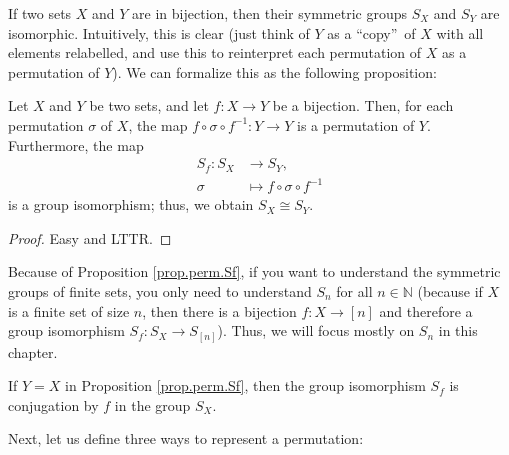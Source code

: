 If two sets $X$ and $Y$ are in bijection, then their symmetric groups $S_{X}$
and $S_{Y}$ are isomorphic. Intuitively, this is clear (just think of $Y$ as a
\textquotedblleft copy\textquotedblright\ of $X$ with all elements relabelled,
and use this to reinterpret each permutation of $X$ as a permutation of $Y$).
We can formalize this as the following proposition:

\begin{proposition}
\label{prop.perm.Sf}Let $X$ and $Y$ be two sets, and let $f:X\rightarrow Y$ be
a bijection. Then, for each permutation $\sigma$ of $X$, the map $f\circ
\sigma\circ f^{-1}:Y\rightarrow Y$ is a permutation of $Y$. Furthermore, the
map%
\begin{align*}
S_{f}:S_{X}  &  \rightarrow S_{Y},\\
\sigma &  \mapsto f\circ\sigma\circ f^{-1}%
\end{align*}
is a group isomorphism; thus, we obtain $S_{X}\cong S_{Y}$.
\end{proposition}

\begin{proof}
Easy and LTTR.
\end{proof}

Because of Proposition \ref{prop.perm.Sf}, if you want to understand the
symmetric groups of finite sets, you only need to understand $S_{n}$ for all
$n\in\mathbb{N}$ (because if $X$ is a finite set of size $n$, then there is a
bijection $f:X\rightarrow\left[  n\right]  $ and therefore a group isomorphism
$S_{f}:S_{X}\rightarrow S_{\left[  n\right]  }$). Thus, we will focus mostly
on $S_{n}$ in this chapter.

\begin{remark}
If $Y=X$ in Proposition \ref{prop.perm.Sf}, then the group isomorphism $S_{f}$
is conjugation by $f$ in the group $S_{X}$.
\end{remark}

Next, let us define three ways to represent a permutation:

